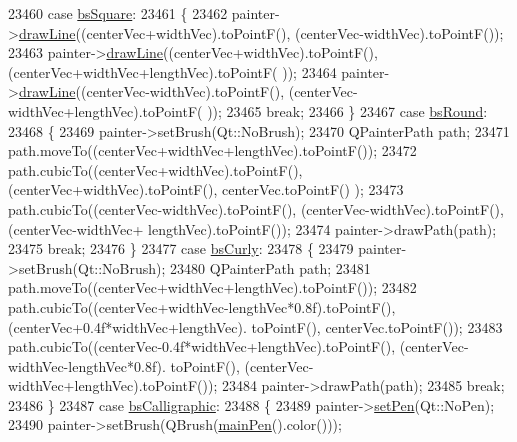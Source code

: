 \begin{DoxyCode}
23460       \textcolor{keywordflow}{case} \hyperlink{class_q_c_p_item_bracket_a7ac3afd0b24a607054e7212047d59dbda7f9df4a7359bfe3dac1dbe4ccf5d220c}{bsSquare}:
23461       \{
23462         painter->\hyperlink{class_q_c_p_painter_a0b4b1b9bd495e182c731774dc800e6e0}{drawLine}((centerVec+widthVec).toPointF(), (centerVec-widthVec).toPointF());
23463         painter->\hyperlink{class_q_c_p_painter_a0b4b1b9bd495e182c731774dc800e6e0}{drawLine}((centerVec+widthVec).toPointF(), (centerVec+widthVec+lengthVec).toPointF(
      ));
23464         painter->\hyperlink{class_q_c_p_painter_a0b4b1b9bd495e182c731774dc800e6e0}{drawLine}((centerVec-widthVec).toPointF(), (centerVec-widthVec+lengthVec).toPointF(
      ));
23465         \textcolor{keywordflow}{break};
23466       \}
23467       \textcolor{keywordflow}{case} \hyperlink{class_q_c_p_item_bracket_a7ac3afd0b24a607054e7212047d59dbda394627b0830a26ee3e0a02ca67a9f918}{bsRound}:
23468       \{
23469         painter->setBrush(Qt::NoBrush);
23470         QPainterPath path;
23471         path.moveTo((centerVec+widthVec+lengthVec).toPointF());
23472         path.cubicTo((centerVec+widthVec).toPointF(), (centerVec+widthVec).toPointF(), centerVec.toPointF()
      );
23473         path.cubicTo((centerVec-widthVec).toPointF(), (centerVec-widthVec).toPointF(), (centerVec-widthVec+
      lengthVec).toPointF());
23474         painter->drawPath(path);
23475         \textcolor{keywordflow}{break};
23476       \}
23477       \textcolor{keywordflow}{case} \hyperlink{class_q_c_p_item_bracket_a7ac3afd0b24a607054e7212047d59dbda5024ce4023c2d8de4221f1cd4816acd8}{bsCurly}:
23478       \{
23479         painter->setBrush(Qt::NoBrush);
23480         QPainterPath path;
23481         path.moveTo((centerVec+widthVec+lengthVec).toPointF());
23482         path.cubicTo((centerVec+widthVec-lengthVec*0.8f).toPointF(), (centerVec+0.4f*widthVec+lengthVec).
      toPointF(), centerVec.toPointF());
23483         path.cubicTo((centerVec-0.4f*widthVec+lengthVec).toPointF(), (centerVec-widthVec-lengthVec*0.8f).
      toPointF(), (centerVec-widthVec+lengthVec).toPointF());
23484         painter->drawPath(path);
23485         \textcolor{keywordflow}{break};
23486       \}
23487       \textcolor{keywordflow}{case} \hyperlink{class_q_c_p_item_bracket_a7ac3afd0b24a607054e7212047d59dbda8f29f5ef754e2dc9a9efdedb2face0f3}{bsCalligraphic}:
23488       \{
23489         painter->\hyperlink{class_q_c_p_painter_af9c7a4cd1791403901f8c5b82a150195}{setPen}(Qt::NoPen);
23490         painter->setBrush(QBrush(\hyperlink{class_q_c_p_item_bracket_a8df4ad873bf88a4a7bfb9bbbd490e495}{mainPen}().color()));

\end{DoxyCode}
